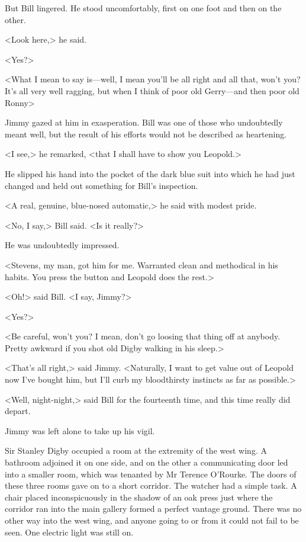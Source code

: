 But Bill lingered. He stood uncomfortably, first on one foot and then on the other.

<Look here,> he said.

<Yes?>

<What I mean to say is—well, I mean you'll be all right and all that, won't you? It's all very well ragging, but when I think of poor old Gerry—and then poor old Ronny\longdash>

Jimmy gazed at him in exasperation. Bill was one of those who undoubtedly meant well, but the result of his efforts would not be described as heartening.

<I see,> he remarked, <that I shall have to show you Leopold.>

He slipped his hand into the pocket of the dark blue suit into which he had just changed and held out something for Bill's inspection.

<A real, genuine, blue-nosed automatic,> he said with modest pride.

<No, I say,> Bill said. <Is it really?>

He was undoubtedly impressed.

<Stevens, my man, got him for me. Warranted clean and methodical in his habits. You press the button and Leopold does the rest.>

<Oh!> said Bill. <I say, Jimmy?>

<Yes?>

<Be careful, won't you? I mean, don't go loosing that thing off at anybody. Pretty awkward if you shot old Digby walking in his sleep.>

<That's all right,> said Jimmy. <Naturally, I want to get value out of Leopold now I've bought him, but I'll curb my bloodthirsty instincts as far as possible.>

<Well, night-night,> said Bill for the fourteenth time, and this time really did depart.

Jimmy was left alone to take up his vigil.

Sir Stanley Digby occupied a room at the extremity of the west wing. A bathroom adjoined it on one side, and on the other a communicating door led into a smaller room, which was tenanted by Mr Terence O'Rourke. The doors of these three rooms gave on to a short corridor. The watcher had a simple task. A chair placed inconspicuously in the shadow of an oak press just where the corridor ran into the main gallery formed a perfect vantage ground. There was no other way into the west wing, and anyone going to or from it could not fail to be seen. One electric light was still on.

